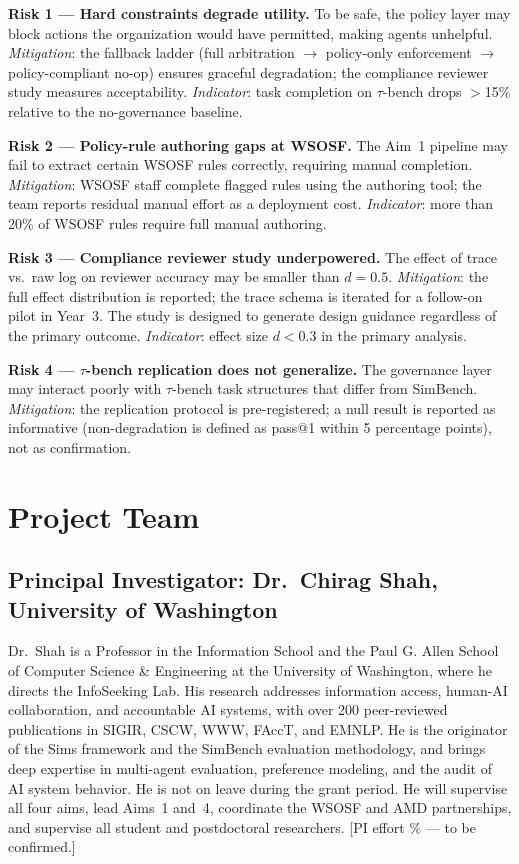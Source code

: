\documentclass[11pt]{article}
\begin{document}
\textbf{Risk 1 --- Hard constraints degrade utility.} To be safe, the policy layer may block actions the organization would have permitted, making agents unhelpful. \textit{Mitigation}: the fallback ladder (full arbitration $\to$ policy-only enforcement $\to$ policy-compliant no-op) ensures graceful degradation; the compliance reviewer study measures acceptability. \textit{Indicator}: task completion on $\tau$-bench drops $>$15\% relative to the no-governance baseline.

\textbf{Risk 2 --- Policy-rule authoring gaps at WSOSF.} The Aim~1 pipeline may fail to extract certain WSOSF rules correctly, requiring manual completion. \textit{Mitigation}: WSOSF staff complete flagged rules using the authoring tool; the team reports residual manual effort as a deployment cost. \textit{Indicator}: more than 20\% of WSOSF rules require full manual authoring.

\textbf{Risk 3 --- Compliance reviewer study underpowered.} The effect of trace vs.\ raw log on reviewer accuracy may be smaller than $d = 0.5$. \textit{Mitigation}: the full effect distribution is reported; the trace schema is iterated for a follow-on pilot in Year~3. The study is designed to generate design guidance regardless of the primary outcome. \textit{Indicator}: effect size $d < 0.3$ in the primary analysis.

\textbf{Risk 4 --- $\tau$-bench replication does not generalize.} The governance layer may interact poorly with $\tau$-bench task structures that differ from SimBench. \textit{Mitigation}: the replication protocol is pre-registered; a null result is reported as informative (non-degradation is defined as pass@1 within 5 percentage points), not as confirmation.

\section{Project Team}

\subsection{Principal Investigator: Dr.\ Chirag Shah, University of Washington}

Dr.\ Shah is a Professor in the Information School and the Paul G. Allen School of Computer Science \& Engineering at the University of Washington, where he directs the InfoSeeking Lab. His research addresses information access, human-AI collaboration, and accountable AI systems, with over 200 peer-reviewed publications in SIGIR, CSCW, WWW, FAccT, and EMNLP. He is the originator of the Sims framework and the SimBench evaluation methodology, and brings deep expertise in multi-agent evaluation, preference modeling, and the audit of AI system behavior. He is not on leave during the grant period. He will supervise all four aims, lead Aims~1 and~4, coordinate the WSOSF and AMD partnerships, and supervise all student and postdoctoral researchers. [PI effort \% --- to be confirmed.]
\end{document}
